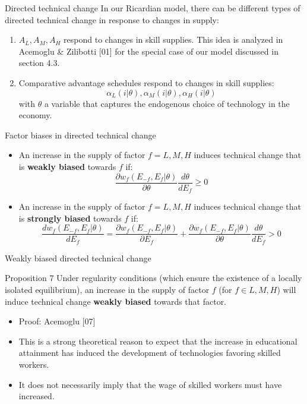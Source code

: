 \documentclass[notes=show]{beamer}
\begin{document}
\begin{frame}{Directed technical change}
In our Ricardian model, there can be different types of directed technical change in response to changes in supply:
\begin{enumerate}
\item $A_{L}, A_{M}, A_{H}$ respond to changes in skill supplies. This idea is analyzed in Acemoglu \& Zilibotti [01] for the special case of our model discussed in section 4.3.
\item Comparative advantage schedules respond to changes in skill supplies:
\[
\alpha_{L}(i| \theta), \alpha_{M}(i| \theta), \alpha_{H}(i| \theta)
\]
with $\theta$ a variable that captures the endogenous choice of technology in the economy.
\end{enumerate}
\end{frame}

\begin{frame}{Factor biases in directed technical change}
\begin{itemize}
\item An increase in the supply of factor $f=L,M,H$ induces technical change that is \textbf{weakly biased} towards $f$ if:
\[
\frac{\partial w_{f}(E_{-f}, E_{f} | \theta )}{\partial \theta}\frac{d \theta}{d E_{f}} \geq 0
\]
\item An increase in the supply of factor $f=L,M,H$ induces technical change that is \textbf{strongly biased} towards $f$ if:
\[
\frac{d w_{f}(E_{-f}, E_{f} | \theta )}{d E_{f}} = \frac{\partial w_{f}(E_{-f}, E_{f} | \theta )}{\partial E_{f}} + \frac{\partial w_{f}(E_{-f}, E_{f} | \theta )}{\partial \theta}\frac{d \theta}{d E_{f}} > 0
\]
\end{itemize}
\end{frame}

\begin{frame}{Weakly biased directed technical change}
\begin{block}{Proposition 7}
Under regularity conditions (which ensure the existence of a locally isolated equilibrium), an increase in the supply of factor $f$ (for $f \in {L,M,H}$) will induce technical change \textbf{weakly biased} towards that factor.
\end{block}
\begin{itemize}
\item Proof: Acemoglu [07] \smallskip
\item This is a strong theoretical reason to expect that the increase in educational attainment has induced the development of technologies favoring skilled workers. \smallskip
\item It does not necessarily imply that the wage of skilled workers must have increased. 
\end{itemize}
\end{frame}
\end{document}
